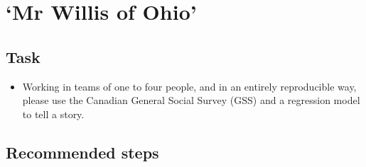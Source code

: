 \documentclass[
]{book}
\providecommand{\tightlist}{%
  \setlength{\itemsep}{0pt}\setlength{\parskip}{0pt}}
\begin{document}
\hypertarget{mr-willis-of-ohio}{%
\section{`Mr Willis of Ohio'}\label{mr-willis-of-ohio}}

\hypertarget{task-5}{%
\subsection{Task}\label{task-5}}

\begin{itemize}
\tightlist
\item
  Working in teams of one to four people, and in an entirely reproducible way, please use the Canadian General Social Survey (GSS) and a regression model to tell a story.
\end{itemize}

\hypertarget{recommended-steps-1}{%
\subsection{Recommended steps}\label{recommended-steps-1}}
\end{document}
